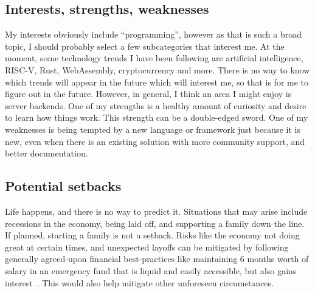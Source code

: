 \subsection{Interests, strengths, weaknesses}
My interests obviously include ``programming'', however as that is such a broad
topic, I should probably select a few subcategories that interest me.  At the
moment, some technology trends I have been following are artificial
intelligence, RISC-V, Rust, WebAssembly, cryptocurrency and more.  There is no
way to know which trends will appear in the future which will interest me, so
that is for me to figure out in the future. However, in general, I think an area
I might enjoy is server backends.  One of my strengths is a healthy amount of
curiosity and desire to learn how things work. This strength can be a
double-edged sword. One of my weaknesses is being tempted by a new language or
framework just because it is new, even when there is an existing solution with
more community support, and better documentation. 

\subsection{Potential setbacks}
Life happens, and there is no way to predict it. Situations that may arise
include recessions in the economy, being laid off, and supporting a family down
the line. If planned, starting a family is not a setback.  Risks like the
economy not doing great at certain times, and unexpected layoffs can be
mitigated by following generally agreed-upon financial best-practices like
maintaining 6 months worth of salary in an emergency fund that is liquid and
easily accessible, but also gains interest~\cite{r/personalfinancecanada}. This
would also help mitigate other unforeseen circumstances. 

